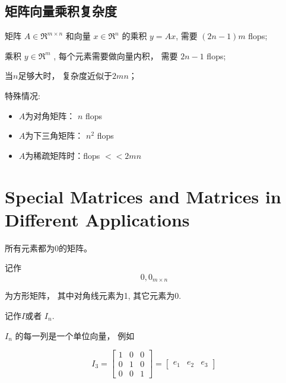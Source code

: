 \subsection{矩阵向量乘积复杂度}

矩阵 $ A \in \mathfrak{R}^{m \times n} $ 和向量 $ x \in \mathfrak{R}^{n} $ 的乘积 $ {y}={A} x $, 需要 $ (2 {n}-1) {m} $ flops;

乘积 $ y \in \mathfrak{R}^{m} $ , 每个元素需要做向量内积， 需要 $ 2 n-1 $ flops;

当$n$足够大时， 复杂度近似于$2mn$；

特殊情况:

\begin{itemize}
    \item $A$为对角矩阵： $ {n} $ flops
    \item $A$为下三角矩阵： $ n^{2} $ flops
    \item $A$为稀疏矩阵时：flops $ <<2 m n $
\end{itemize}


\section{Special Matrices and Matrices in Different Applications}

\begin{definition}
    所有元素都为0的矩阵。

    记作\begin{equation}0, 0_{m \times n} \end{equation}
\end{definition}

\begin{definition}[单位矩阵]
    为方形矩阵， 其中对角线元素为1, 其它元素为0.

    记作$I$或者 $ {I}_{n} $.
\end{definition}

\begin{corollary}
  $ {I}_{n} $ 的每一列是一个单位向量， 例如

\begin{equation}
{I}_{3}=\left[\begin{array}{lll}
1 & 0 & 0 \\
0 & 1 & 0 \\
0 & 0 & 1
\end{array}\right]=\left[\begin{array}{lll}
e_{1} & e_{2} & e_{3}
\end{array}\right]
\end{equation}
\end{corollary}

